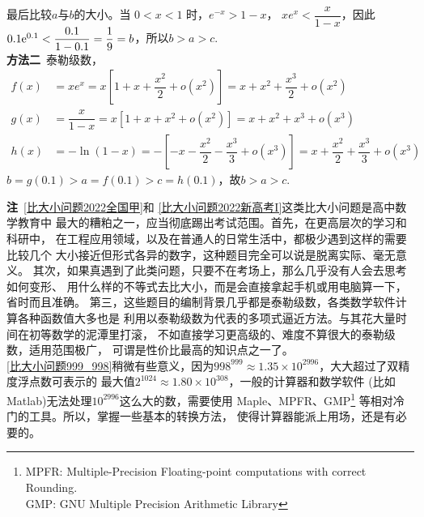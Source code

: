 \begin{enumerate}[label={【\textbf{例\thechapter.\arabic*}】},
 leftmargin=\inteval{\myenumleftmargin}pt,
 itemsep=\inteval{\myenumitempsep}pt,
 itemindent=\inteval{\myenumitemindent}pt]
最后比较$a$与$b$的大小。当 $0<x<1$ 时，$e^{-x} > 1-x$，
$x e^{x}<\dfrac{x}{1-x} $，因此$ 0.1 \mathrm{e}^{0.1}<
\dfrac{0.1}{1-0.1}=\dfrac{1}{9}=b $，所以$b>a>c$. \\
\textbf{方法二}\ 泰勒级数，
\begin{align*}
    f(x) &=xe^{x}=x\left[1+x+\dfrac{x^{2}}{2}+o\left(x^{2}\right)\right]
    =x+x^{2}+\dfrac{x^{3}}{2}+o\left(x^{2}\right)\\
    g(x) &=\dfrac{x}{1-x}=x\left[1+x+x^{2}+o\left(x^{2}\right)\right]
    =x+x^2+x^3+o\left(x^{3}\right) \\
    h(x) &=-\ln(1-x)=-\left[-x-\dfrac{x^{2}}{2}-\dfrac{x^3}{3}+o\left(x^{3}\right)
    \right]=x+\dfrac{x^{2}}{2}+\dfrac{x^3}{3}+o\left(x^{3}\right)
\end{align*}
$b=g(0.1)>a=f(0.1)>c=h(0.1)$，故$b>a>c$. 

\textbf{注}\ \ref{比大小问题2022全国甲}和
\ref{比大小问题2022新高考I}这类比大小问题是高中数学教育中
最大的糟粕之一，应当彻底踢出考试范围。首先，在更高层次的学习和科研中，
在工程应用领域，以及在普通人的日常生活中，都极少遇到这样的需要比较几个
大小接近但形式各异的数字，这种题目完全可以说是脱离实际、毫无意义。
其次，如果真遇到了此类问题，只要不在考场上，那么几乎没有人会去思考如何变形、
用什么样的不等式去比大小，而是会直接拿起手机或用电脑算一下，省时而且准确。
第三，这些题目的编制背景几乎都是泰勒级数，各类数学软件计算各种函数值大多也是
利用以泰勒级数为代表的多项式逼近方法。与其花大量时间在初等数学的泥潭里打滚，
不如直接学习更高级的、难度不算很大的泰勒级数，适用范围极广，
可谓是性价比最高的知识点之一了。 \\
\ref{比大小问题999_998}稍微有些意义，因为$ 998^{999}\approx
1.35\times 10^{2996} $，大大超过了双精度浮点数可表示的
最大值$ 2^{1024}\approx 1.80\times10^{308} $，一般的计算器和数学软件
(比如Matlab)无法处理$ 10^{2996} $这么大的数，需要使用
Maple、MPFR、GMP\footnote{MPFR: Multiple-Precision Floating-point computations with correct Rounding. \\
GMP: GNU Multiple Precision Arithmetic Library}
等相对冷门的工具。所以，掌握一些基本的转换方法，
使得计算器能派上用场，还是有必要的。


\end{enumerate}
